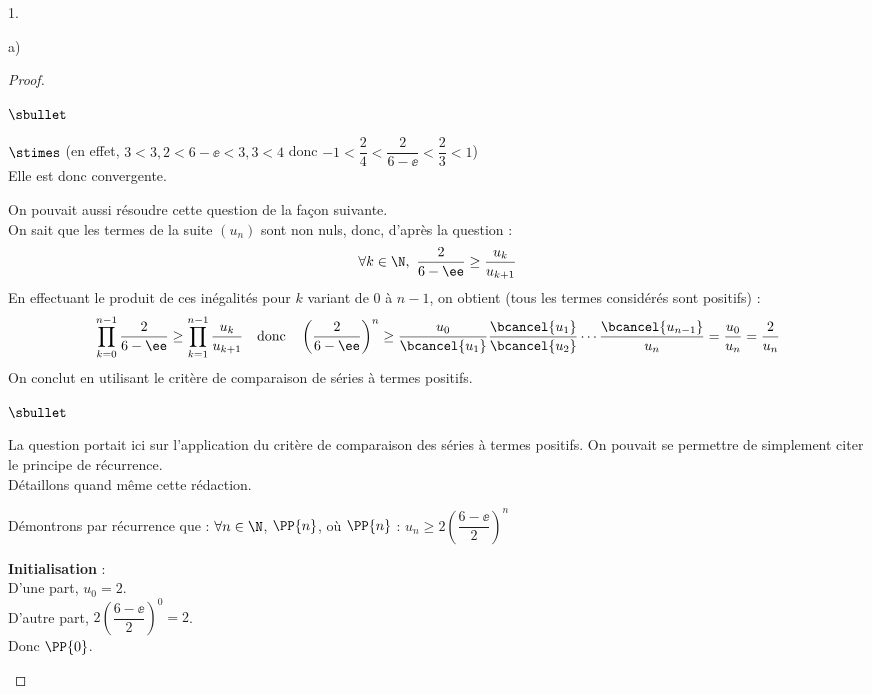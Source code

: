 \documentclass[11pt]{article}%
\begin{document}
\begin{noliste}{1.}
\begin{noliste}{a)}
\begin{proof}
\begin{noliste}{$\sbullet$}
\begin{noliste}{$\stimes$}
          (en effet, $3<3,2<6-\ee<3,3<4$ donc
          $-1<\dfrac{2}{4}<\dfrac{2}{6-\ee}<\dfrac{2}{3}<1$)\\
          Elle est donc convergente.
        \end{noliste}
      \end{noliste}
  \begin{remark}%
    On pouvait aussi résoudre cette question de la façon suivante.\\
    On sait que les termes de la suite $(u_n)$ sont non nuls, donc,
    d'après la question  :
    \[
    \forall k \in \N, \ \dfrac{2}{6-\ee}\geq \frac{u_k}{u_{k+1}}
    \]
    En effectuant le produit de ces inégalités pour $k$ variant de $0$
    à $n-1$, on obtient (tous les termes considérés sont positifs) :
    \[
    \prod_{k=0}^{n-1} \frac{2}{6-\ee} \geq \prod_{k=1}^{n-1} 
    \frac{u_k}{u_{k+1}} \quad \mbox{donc} \quad 
    \left(\frac{2}{6-\ee}\right)^n \geq \frac{u_0}{\bcancel{u_1}} 
    \frac{\bcancel{u_1}}{\bcancel{u_2}} \cdots 
    \frac{\bcancel{u_{n-1}}}{u_n}=\frac{u_0}{u_n}=\frac{2}{u_n}
    \]
    On conclut en utilisant le critère de comparaison de séries à 
    termes positifs.
  \end{remark}
  

  \newpage


  \begin{remark}
    \begin{noliste}{$\sbullet$}
    \item La question portait ici sur l'application du critère de
      comparaison des séries à termes positifs. On pouvait se
      permettre de simplement citer le principe de récurrence.\\
      Détaillons quand même cette rédaction.
    \item Démontrons par récurrence que : $\forall n\in\N$, $\PP{n}$,
      \quad où \quad $\PP{n}$ : $u_n\geq 2
      \left(\dfrac{6-\ee}{2}\right)^n$
      \begin{noliste}{\fitem}
      \item {\bf Initialisation} : \\
        D'une part, $u_0=2$.\\
        D'autre part, $2\left(\dfrac{6-\ee}{2}\right)^0=2$.\\
        Donc $\PP{0}$.
        

\end{noliste}
\end{noliste}
\end{remark}
\end{proof}
\end{noliste}
\end{noliste}
\end{document}
